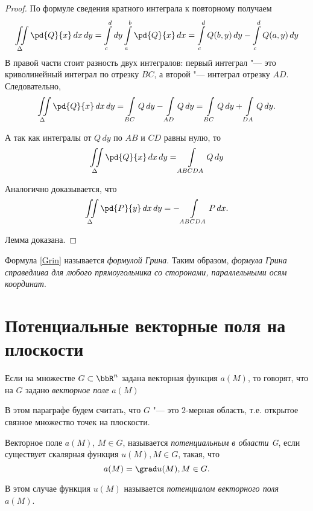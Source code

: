 \begin{proof}
По формуле сведения кратного интеграла к повторному получаем
$$
\iint\limits_{\Delta} \pd{Q}{x} \,dx\,dy = \int_{c}^{d}\limits dy \int_a^b\limits \pd{Q}{x}\,dx = \int_c^d\limits Q(b,y)\,dy - \int_c^d\limits Q(a,y)\,dy
$$
В правой части стоит разность двух интегралов: первый интеграл "--- это криволинейный интеграл по отрезку $BC$, а второй "--- интеграл отрезку $AD$. Следовательно,
$$
\iint\limits_\Delta\pd{Q}{x}\,dx\,dy = \int_{BC}\limits Q\,dy - \int_{AD}\limits Q\,dy = \int_{BC}\limits Q\,dy + \int_{DA}\limits Q\,dy.
$$

А так как интегралы от $Q\,dy$ по $AB$ и $CD$ равны нулю, то
$$
\iint\limits_\Delta\pd{Q}{x}\,dx\,dy = \int\limits_{ABCDA} Q\,dy
$$

Аналогично доказывается, что
$$
\iint\limits_\Delta\pd{P}{y}\,dx\,dy = -\int\limits_{ABCDA} P\,dx.  
$$

Лемма доказана.
\end{proof}
Формула \eqref{Grin} называется \textit{формулой Грина}. Таким образом, \textit{формула Грина справедлива для любого прямоугольника со сторонами, параллельными осям координат}.


\section{Потенциальные векторные поля на плоскости}

Если на множестве $G \subset \bbR^n$ задана векторная функция $a(M)$, то говорят, что на $G$ задано \textit{векторное поле} $a(M)$ 

В этом параграфе будем считать, что $G$ "--- это $2$-мерная область, т.е. открытое связное множество точек на плоскости.

\begin{defn}
Векторное поле $a(M)$, $M\in G$, называется \textit{потенциальным в области G}, если существует скалярная функция $u(M), M\in G$, такая, что 
$$
a(M) = \grad u(M), M \in G.
$$

В этом случае функция $u(M)$ называется \textit{потенциалом векторного поля} $a(M)$.
\end{defn}